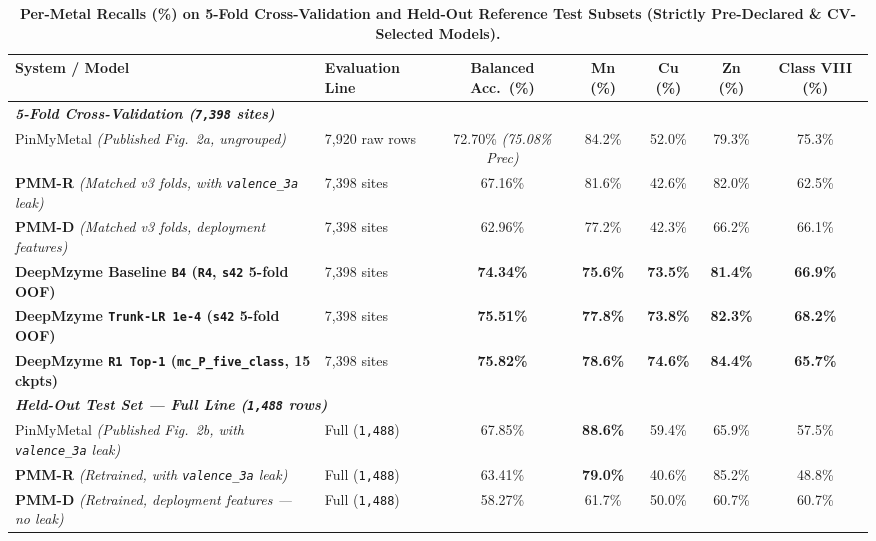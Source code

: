 \documentclass[10pt,a4paper,twocolumn]{article}
\begin{document}
\begin{table}[t!]
  \centering
  \caption{\textbf{Per-Metal Recalls (\%) on 5-Fold Cross-Validation and Held-Out Reference Test Subsets (Strictly Pre-Declared \& CV-Selected Models).}}
  \label{tab:per_metal_recalls}
  \footnotesize
  \begin{tabular}{llccccc}
    \toprule
    \textbf{System / Model} & \textbf{Evaluation Line} & \textbf{Balanced Acc.\ (\%)} & \textbf{Mn (\%)} & \textbf{Cu (\%)} & \textbf{Zn (\%)} & \textbf{Class VIII (\%)} \\
    \midrule
    \multicolumn{7}{l}{\textit{\textbf{5-Fold Cross-Validation (\texttt{7,398} sites)}}} \\
    PinMyMetal \textit{(Published Fig.\ 2a, ungrouped)} & 7,920 raw rows & 72.70\% \textit{(75.08\% Prec)} & 84.2\% & 52.0\% & 79.3\% & 75.3\% \\
    \textbf{PMM-R} \textit{(Matched v3 folds, with \texttt{valence\_3a} leak)} & 7,398 sites & 67.16\% & 81.6\% & 42.6\% & 82.0\% & 62.5\% \\
    \textbf{PMM-D} \textit{(Matched v3 folds, deployment features)} & 7,398 sites & 62.96\% & 77.2\% & 42.3\% & 66.2\% & 66.1\% \\
    \textbf{DeepMzyme Baseline \texttt{B4} (\texttt{R4}, \texttt{s42} 5-fold OOF)} & 7,398 sites & \textbf{74.34\%} & \textbf{75.6\%} & \textbf{73.5\%} & \textbf{81.4\%} & \textbf{66.9\%} \\
    \textbf{DeepMzyme \texttt{Trunk-LR 1e-4} (\texttt{s42} 5-fold OOF)} & 7,398 sites & \textbf{75.51\%} & \textbf{77.8\%} & \textbf{73.8\%} & \textbf{82.3\%} & \textbf{68.2\%} \\
    \textbf{DeepMzyme \texttt{R1 Top-1} (\texttt{mc\_P\_five\_class}, 15 ckpts)} & 7,398 sites & \textbf{75.82\%} & \textbf{78.6\%} & \textbf{74.6\%} & \textbf{84.4\%} & \textbf{65.7\%} \\
    \midrule
    \multicolumn{7}{l}{\textit{\textbf{Held-Out Test Set --- Full Line (\texttt{1,488} rows)}}} \\
    PinMyMetal \textit{(Published Fig.\ 2b, with \texttt{valence\_3a} leak)} & Full (\texttt{1,488}) & 67.85\% & \textbf{88.6\%} & 59.4\% & 65.9\% & 57.5\% \\
    \textbf{PMM-R} \textit{(Retrained, with \texttt{valence\_3a} leak)} & Full (\texttt{1,488}) & 63.41\% & \textbf{79.0\%} & 40.6\% & 85.2\% & 48.8\% \\
    \textbf{PMM-D} \textit{(Retrained, deployment features --- no leak)} & Full (\texttt{1,488}) & 58.27\% & 61.7\% & 50.0\% & 60.7\% & 60.7\% \\

\end{tabular}
\end{table}
\end{document}
